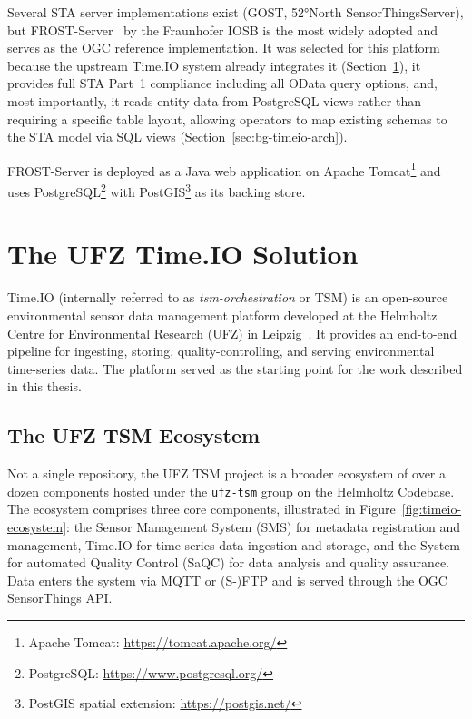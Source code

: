 Several STA server implementations exist (GOST, 52°North SensorThingsServer), but
FROST-Server~\cite{frost-server} by the Fraunhofer IOSB is the most widely adopted and
serves as the OGC reference implementation. It was selected for this platform because
the upstream Time.IO system already integrates it (Section~\ref{sec:bg-timeio}), it
provides full STA Part~1 compliance including all OData query options, and, most
importantly, it reads entity data from PostgreSQL views rather than requiring a specific
table layout, allowing operators to map existing schemas to the STA model via SQL views
(Section~\ref{sec:bg-timeio-arch}).

FROST-Server is deployed as a Java web application on Apache Tomcat\footnote{Apache Tomcat: \url{https://tomcat.apache.org/}} and uses PostgreSQL\footnote{PostgreSQL: \url{https://www.postgresql.org/}} with PostGIS\footnote{PostGIS spatial extension: \url{https://postgis.net/}} as its backing store.

\section{The UFZ Time.IO Solution}
\label{sec:bg-timeio}

Time.IO (internally referred to as \emph{tsm-orchestration} or TSM) is an open-source environmental
sensor data management platform developed at the Helmholtz Centre for Environmental Research (UFZ)
in Leipzig~\mbox{\cite{bumberger2025timeio,timeio-ref}}. It provides an end-to-end pipeline for ingesting, storing,
quality-controlling, and serving environmental time-series data. The platform served as the starting
point for the work described in this thesis.

\subsection{The UFZ TSM Ecosystem}
\label{sec:bg-timeio-ecosystem}

Not a single repository, the UFZ TSM project is a broader ecosystem of over a dozen
components hosted under the \texttt{ufz-tsm} group on the Helmholtz Codebase. The ecosystem comprises three core components, illustrated in Figure~\ref{fig:timeio-ecosystem}: the Sensor Management System (SMS) for metadata registration and management, Time.IO for time-series data ingestion and storage, and the System for automated Quality Control (SaQC) for data analysis and quality assurance. Data enters the system via MQTT or (S-)FTP and is served through the OGC SensorThings API.

